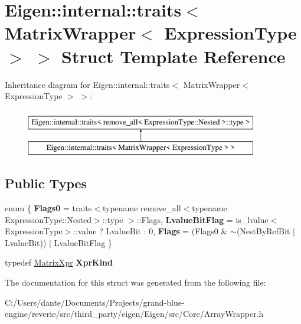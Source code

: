 \hypertarget{struct_eigen_1_1internal_1_1traits_3_01_matrix_wrapper_3_01_expression_type_01_4_01_4}{}\section{Eigen\+::internal\+::traits$<$ Matrix\+Wrapper$<$ Expression\+Type $>$ $>$ Struct Template Reference}
\label{struct_eigen_1_1internal_1_1traits_3_01_matrix_wrapper_3_01_expression_type_01_4_01_4}
Inheritance diagram for Eigen\+::internal\+::traits$<$ Matrix\+Wrapper$<$ Expression\+Type $>$ $>$\+:\begin{figure}[H]
\begin{center}
\leavevmode
\includegraphics[height=2.000000cm]{struct_eigen_1_1internal_1_1traits_3_01_matrix_wrapper_3_01_expression_type_01_4_01_4}
\end{center}
\end{figure}
\subsection*{Public Types}
\begin{DoxyCompactItemize}
\item 
\mbox{\label{struct_eigen_1_1internal_1_1traits_3_01_matrix_wrapper_3_01_expression_type_01_4_01_4_ae76f572f8578d89c3306186ef7718e9f}} 
enum \{ {\bfseries Flags0} = traits$<$typename remove\+\_\+all$<$typename Expression\+Type\+::Nested$>$\+::type $>$\+::Flags, 
{\bfseries Lvalue\+Bit\+Flag} = is\+\_\+lvalue$<$Expression\+Type$>$\+::value ? Lvalue\+Bit \+: 0, 
{\bfseries Flags} = (Flags0 \& $\sim$(Nest\+By\+Ref\+Bit $\vert$ Lvalue\+Bit)) $\vert$ Lvalue\+Bit\+Flag
 \}
\item 
\mbox{\label{struct_eigen_1_1internal_1_1traits_3_01_matrix_wrapper_3_01_expression_type_01_4_01_4_ae401c17b667c6513b992141a9f43691f}} 
typedef \mbox{\hyperlink{struct_eigen_1_1_matrix_xpr}{Matrix\+Xpr}} {\bfseries Xpr\+Kind}
\end{DoxyCompactItemize}


The documentation for this struct was generated from the following file\+:\begin{DoxyCompactItemize}
\item 
C\+:/\+Users/dante/\+Documents/\+Projects/grand-\/blue-\/engine/reverie/src/third\+\_\+party/eigen/\+Eigen/src/\+Core/Array\+Wrapper.\+h\end{DoxyCompactItemize}
